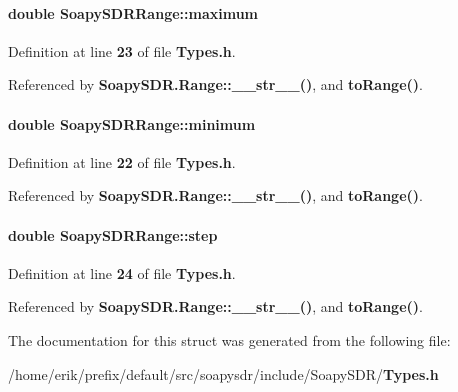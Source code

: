 \paragraph[{maximum}]{\setlength{\rightskip}{0pt plus 5cm}double Soapy\+S\+D\+R\+Range\+::maximum}\label{structSoapySDRRange_a7dd8665d38c6f66f306c1ce0868fd71f}


Definition at line {\bf 23} of file {\bf Types.\+h}.



Referenced by {\bf Soapy\+S\+D\+R.\+Range\+::\+\_\+\+\_\+str\+\_\+\+\_\+()}, and {\bf to\+Range()}.

\paragraph[{minimum}]{\setlength{\rightskip}{0pt plus 5cm}double Soapy\+S\+D\+R\+Range\+::minimum}\label{structSoapySDRRange_a6de3066aaf77a4bff5cd2599ca5e1b31}


Definition at line {\bf 22} of file {\bf Types.\+h}.



Referenced by {\bf Soapy\+S\+D\+R.\+Range\+::\+\_\+\+\_\+str\+\_\+\+\_\+()}, and {\bf to\+Range()}.

\paragraph[{step}]{\setlength{\rightskip}{0pt plus 5cm}double Soapy\+S\+D\+R\+Range\+::step}\label{structSoapySDRRange_ae76acbec09a395ac862c370fde4edaaf}


Definition at line {\bf 24} of file {\bf Types.\+h}.



Referenced by {\bf Soapy\+S\+D\+R.\+Range\+::\+\_\+\+\_\+str\+\_\+\+\_\+()}, and {\bf to\+Range()}.



The documentation for this struct was generated from the following file\+:\begin{DoxyCompactItemize}
\item 
/home/erik/prefix/default/src/soapysdr/include/\+Soapy\+S\+D\+R/{\bf Types.\+h}\end{DoxyCompactItemize}
